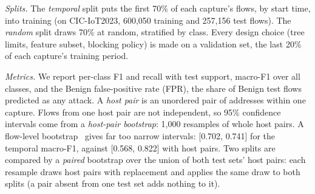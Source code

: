 \emph{Splits.} The \emph{temporal} split puts the first 70\% of each capture's flows, by start time, into training (on CIC-IoT2023, 600,050 training and 257,156 test flows). The \emph{random} split draws 70\% at random, stratified by class. Every design choice (tree limits, feature subset, blocking policy) is made on a validation set, the last 20\% of each capture's training period.

\emph{Metrics.} We report per-class F1 and recall with test support, macro-F1 over all classes, and the Benign false-positive rate (FPR), the share of Benign test flows predicted as any attack. A \emph{host pair} is an unordered pair of addresses within one capture. Flows from one host pair are not independent, so 95\% confidence intervals come from a \emph{host-pair bootstrap}: 1,000 resamples of whole host pairs. A flow-level bootstrap~\cite{efron1994bootstrap} gives far too narrow intervals: [0.702, 0.741] for the temporal macro-F1, against [0.568, 0.822] with host pairs. Two splits are compared by a \emph{paired} bootstrap over the union of both test sets' host pairs: each resample draws host pairs with replacement and applies the same draw to both splits (a pair absent from one test set adds nothing to it).
